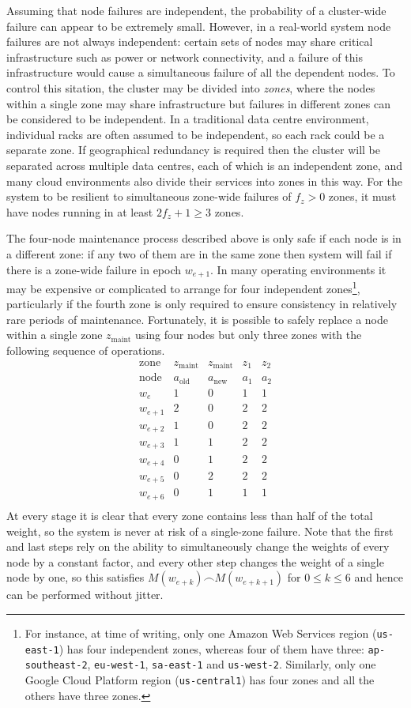 \documentclass[journal]{IEEEtran}
\begin{document}
Assuming that node failures are independent, the probability of a cluster-wide
failure can appear to be extremely small. However, in a real-world system node
failures are not always independent: certain sets of nodes may share critical
infrastructure such as power or network connectivity, and a failure of this
infrastructure would cause a simultaneous failure of all the dependent nodes.
To control this sitation, the cluster may be divided into \textit{zones}, where
the nodes within a single zone may share infrastructure but failures in
different zones can be considered to be independent. In a traditional data
centre environment, individual racks are often assumed to be independent, so
each rack could be a separate zone. If geographical redundancy is required then
the cluster will be separated across multiple data centres, each of which is an
independent zone, and many cloud environments also divide their services into
zones in this way.  For the system to be resilient to simultaneous zone-wide
failures of $f_z > 0$ zones, it must have nodes running in at least $2f_z + 1
\ge 3$ zones.

The four-node maintenance process described above is only safe if each node is
in a different zone: if any two of them are in the same zone then system will
fail if there is a zone-wide failure in epoch $w_{e+1}$.  In many operating
environments it may be expensive or complicated to arrange for four independent
zones\footnote{For instance, at time of writing, only one Amazon Web Services
region (\texttt{us-east-1}) has four independent zones, whereas four of them
have three: \texttt{ap-southeast-2}, \texttt{eu-west-1}, \texttt{sa-east-1} and
\texttt{us-west-2}. Similarly, only one Google Cloud Platform region
(\texttt{us-central1}) has four zones and all the others have three zones.},
particularly if the fourth zone is only required to ensure consistency in
relatively rare periods of maintenance.  Fortunately, it is possible to safely
replace a node within a single zone $z_{\textrm{maint}}$ using four nodes but
only three zones with the following sequence of operations.
\[\begin{array}{rcccc}
\textrm{zone}&z_{\textrm{maint}}&z_{\textrm{maint}}&z_1&z_2\\
\textrm{node}&a_{\textrm{old}}&a_{\textrm{new}}&a_1&a_2\\
w_e&1&0&1&1\\
w_{e+1}&2&0&2&2\\
w_{e+2}&1&0&2&2\\
w_{e+3}&1&1&2&2\\
w_{e+4}&0&1&2&2\\
w_{e+5}&0&2&2&2\\
w_{e+6}&0&1&1&1\\
\end{array}\]
At every stage it is clear that every zone contains less than half of the total
weight, so the system is never at risk of a single-zone failure. Note that the
first and last steps rely on the ability to simultaneously change the weights
of every node by a constant factor, and every other step changes the weight of
a single node by one, so this satisfies $M(w_{e+k}) \frown M(w_{e+k+1})$ for $0
\le k \le 6$ and hence can be performed without jitter.
\end{document}
